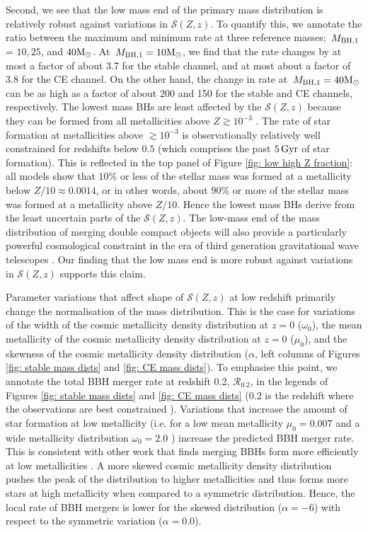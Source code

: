 \documentclass[twocolumn]{aastex631}
\newcommand{\Msun}{\ensuremath{\rm{M}_{\odot}}\xspace}
\newcommand{\Gyr}{\ensuremath{\,\rm{Gyr}}\xspace}
\newcommand{\Mbheen}{\ensuremath{\,M_{\rm BH, 1}}\xspace}
\newcommand{\SFRDzZ}{\ensuremath{\mathcal{S}(Z,z)}\xspace}
\begin{document}
Second, we see that the low mass end of the primary mass distribution is relatively robust against variations in \SFRDzZ. 
To quantify this, we annotate the ratio between the maximum and minimum rate at three reference masses; \Mbheen = $10, 25$, and $40\Msun$.
At $\Mbheen=10\Msun$, we find that the rate changes by at most a factor of about 3.7 for the stable channel, and at most about a factor of 3.8 for the CE channel. 
On the other hand, the change in rate at $\Mbheen=40\Msun$ can be as high as a factor of about 200 and 150 for the stable and CE channels, respectively. 
%
The lowest mass BHs are least affected by the \SFRDzZ because they can be formed from all metallicities above $Z\gtrsim10^{-3}$ \citep[see e.g., Figures 7 and 13 from ][]{vanson+2022}.
The rate of star formation at metallicities above $\gtrsim 10^{-3}$ is observationally relatively well constrained for redshifts below $0.5$ (which comprises the past $5\Gyr$ of star formation). 
This is reflected in the top panel of Figure \ref{fig: low high Z fraction}: all models show that $10\%$ or less of the stellar mass was formed at a metallicity below $Z/10 \approx 0.0014$, or in other words, about $90\%$ or more of the stellar mass was formed at a metallicity above $Z/10$. Hence the lowest mass BHs derive from the least uncertain parts of the \SFRDzZ.
%
The low-mass end of the mass distribution of merging double compact objects will also provide a particularly powerful cosmological constraint in the era of third generation gravitational wave telescopes \citep{MariaEzquiaga2022}. Our finding that the low mass end is more robust against variations in \SFRDzZ supports this claim. 

Parameter variations that affect shape of \SFRDzZ at low redshift primarily change the normalisation of the mass distribution. This is the case for variations of the width of the cosmic metallicity density distribution at $z=0$ ($\omega_0$), the mean metallicity of the cosmic metallicity density distribution at $z=0$ ($\mu_0$), and the skewness of the cosmic metallicity density distribution ($\alpha$, left columns of Figures \ref{fig: stable mass dists} and \ref{fig: CE mass dists}).
To emphasise this point, we annotate the total BBH merger rate at redshift 0.2, $\mathcal{R}_{0.2}$, in the legends of Figures \ref{fig: stable mass dists} and \ref{fig: CE mass dists} (0.2 is the redshift where the observations are best constrained \citealt{GWTC3_popPaper2021}). 
%
Variations that increase the amount of star formation at low metallicity (i.e. for a low mean metallicity $\mu_0=0.007$ and a wide metallicity distribution $\omega_0 = 2.0$ ) increase the predicted BBH merger rate. This is consistent with other work that finds merging BBHs form more efficiently at low metallicities \citep[e.g.][]{BelczynskiVink2010, Stevenson+2017,Mapelli2017,Chruslinska2019_effectCO,Broekgaarden+2021b}.
A more skewed cosmic metallicity density distribution pushes the peak of the distribution to higher metallicities and thus forms more stars at high metallicity when compared to a symmetric distribution. Hence, the local rate of BBH mergers is lower for the skewed distribution ($\alpha = -6$) with respect to the symmetric variation ($\alpha = 0.0$).
\end{document}
